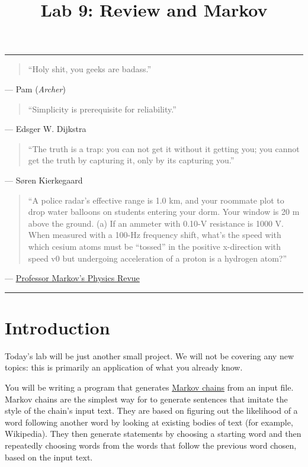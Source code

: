 \documentclass[11pt]{cselabheader}
\title{Lab 9: Review and Markov}
\begin{document}
\maketitle

\hrule
\begin{quotation}
``Holy shit, you geeks are badass.''
\end{quotation}
\begin{flushright}
  --- Pam (\emph{Archer})
\end{flushright}


\begin{quotation}
``Simplicity is prerequisite for reliability.''
\end{quotation}
\begin{flushright}
--- Edsger W. Dijkstra
\end{flushright}


\begin{quotation}
``The truth is a trap: you can not get it without it getting you; you cannot get
the truth by capturing it, only by its capturing you.''
\end{quotation}
\begin{flushright}
--- S{\o}ren Kierkegaard
\end{flushright}

\begin{quotation}
  ``A police radar’s effective range is 1.0 km, and your roommate plot to drop water balloons on students entering your dorm. Your window is 20 m above the ground. (a) If an ammeter with 0.10-V resistance is 1000 V. When measured with a 100-Hz frequency shift, what’s the speed with which cesium atoms must be “tossed” in the positive x-direction with speed v0 but undergoing acceleration of a proton is a hydrogen atom?''
\end{quotation}
\begin{flushright}
  --- \href{http://infohost.nmt.edu/~rkelly/physbot.html}{Professor Markov's Physics Revue}
\end{flushright}

\hrule

\pagebreak
\section{Introduction}

Today's lab will be just another small project.
We will not be covering any new
topics: this is primarily an application of what you already know. 

You will be
writing a program that generates
\href{http://en.wikipedia.org/wiki/Markov_chain}{Markov chains} from an input
file. Markov chains are the simplest way for to generate sentences that
imitate the style of the chain's input text.
They are based on figuring out the
likelihood of a word following another word by looking at existing bodies of
text (for example, Wikipedia). They then generate statements by choosing a
starting word and then repeatedly choosing words from the words that follow
the previous word chosen, based on the input text.
\end{document}
